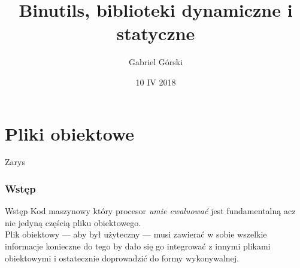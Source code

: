  \usepackage{adjustbox}

\title{Binutils, biblioteki dynamiczne i statyczne} \author{Gabriel Górski}
\date{10 IV 2018} 




\maketitle
\part{Pliki obiektowe}
\begin{frame}{Zarys}
  \tableofcontents
\end{frame}
\section{Wstęp}
\begin{frame}{Wstęp}
  Kod maszynowy który procesor \textit{umie ewaluować} jest fundamentalną acz
  nie jedyną częścią pliku obiektowego.\\

  Plik obiektowy --- aby był użyteczny --- musi zawierać w sobie wszelkie
  informacje konieczne do tego by dało się go integrować z innymi plikami
  obiektowymi i ostatecznie doprowadzić do formy wykonywalnej.
\end{frame}
